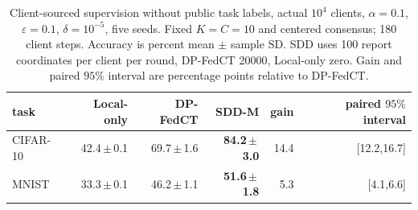 \begin{table}[t]
\centering
\caption{Client-sourced supervision without public task labels, actual $10^4$ clients, $\alpha=0.1$, $\varepsilon=0.1$, $\delta=10^{-5}$, five seeds. Fixed $K=C=10$ and centered consensus; 180 client steps. Accuracy is percent mean $\pm$ sample SD. SDD uses 100 report coordinates per client per round, DP-FedCT 20000, Local-only zero. Gain and paired $95\%$ interval are percentage points relative to DP-FedCT.}
\label{tab:core-supervision}
\small\setlength{\tabcolsep}{3pt}
\begin{tabular}{@{}lrrrrr@{}}\toprule
task & Local-only & DP-FedCT & SDD-M & gain & paired $95\%$ interval \\\midrule
CIFAR-10 & 42.4\,$\pm$\,0.1 & 69.7\,$\pm$\,1.6 & \textbf{84.2\,$\pm$\,3.0} & 14.4 & [12.2,16.7] \\
MNIST & 33.3\,$\pm$\,0.1 & 46.2\,$\pm$\,1.1 & \textbf{51.6\,$\pm$\,1.8} & 5.3 & [4.1,6.6] \\
\bottomrule\end{tabular}
\end{table}
